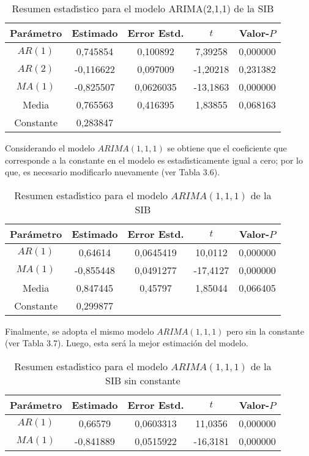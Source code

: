 \begin{ejemplo}
\begin{table}[H]
\centering\small
\caption{Resumen estad\'{\i}stico para el modelo ARIMA(2,1,1) de la SIB}
\begin{tabular}{@{}ccccc@{}}
\toprule
Par\'{a}metro& Estimado& Error Estd.& $t$& Valor-$P$ \\
\midrule
$AR(1)$& 0,745854& 0,100892& 7,39258& 0,000000 \\
$AR(2)$& -0,116622& 0,097009& -1,20218& 0,231382 \\
$MA(1)$& -0,825507& 0,0626035& -13,1863& 0,000000 \\
Media& 0,765563& 0,416395& 1,83855& 0,068163 \\
Constante& 0,283847& & &  \\
\bottomrule
\end{tabular}
\end{table}


Considerando el modelo $ARIMA(1,1,1)$ se obtiene que el coeficiente que 
corresponde a la constante en el modelo es estad\'{\i}sticamente igual a 
cero; por lo que, es necesario modificarlo nuevamente (ver Tabla 3.6). 

\begin{table}[H]
\centering\small
\caption{Resumen estad\'{\i}stico para el modelo $ARIMA(1,1,1)$ de la SIB}
\begin{tabular}{@{}ccccc@{}}
\toprule
Par\'{a}metro& Estimado& Error Estd.& $t$& Valor-$P$ \\
\midrule
$AR(1)$& 0,64614& 0,0645419& 10,0112& 0,000000 \\
$MA(1)$& -0,855448& 0,0491277& -17,4127& 0,000000 \\
Media& 0,847445& 0,45797& 1,85044& 0,066405 \\
Constante& 0,299877& & &  \\
\bottomrule
\end{tabular}
\end{table}

Finalmente, se adopta el mismo modelo $ARIMA(1,1,1)$ pero sin la constante 
(ver Tabla 3.7). Luego, esta ser\'{a} la mejor estimaci\'{o}n del modelo.

\begin{table}[H]
\centering\small
\caption{Resumen estad\'{\i}stico para el modelo $ARIMA(1,1,1)$ de la SIB 
sin constante}
\begin{tabular}{@{}ccccc@{}}
\toprule
Par\'{a}metro& Estimado& Error Estd.& $t$&Valor-$P$ \\
\midrule
$AR(1)$& 0,66579& 0,0603313& 11,0356& 0,000000 \\
$MA(1)$& -0,841889& 0,0515922& -16,3181& 0,000000 \\
\bottomrule
\end{tabular}
\end{table}

\end{ejemplo}




